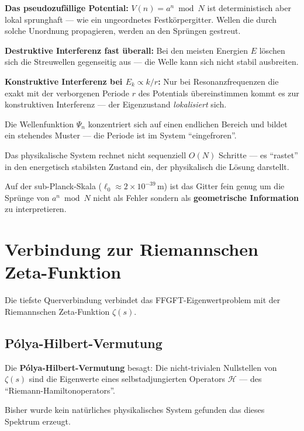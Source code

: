\textbf{Das pseudozufällige Potential:}
$V(n) = a^n \bmod N$ ist deterministisch aber
lokal sprunghaft --- wie ein ungeordnetes Festkörpergitter.
Wellen die durch solche Unordnung propagieren,
werden an den Sprüngen gestreut.

\textbf{Destruktive Interferenz fast überall:}
Bei den meisten Energien $E$ löschen sich die
Streuwellen gegenseitig aus ---
die Welle kann sich nicht stabil ausbreiten.

\textbf{Konstruktive Interferenz bei $E_k \propto k/r$:}
Nur bei Resonanzfrequenzen die exakt mit der
verborgenen Periode $r$ des Potentials übereinstimmen
kommt es zur konstruktiven Interferenz ---
der Eigenzustand \emph{lokalisiert} sich.

\begin{foundation}
Die Wellenfunktion $\Psi_n$ konzentriert sich
auf einen endlichen Bereich und bildet ein
stehendes Muster --- die Periode ist
im System ``eingefroren''.

Das physikalische System rechnet nicht sequenziell
$O(N)$ Schritte --- es ``rastet'' in den
energetisch stabilsten Zustand ein,
der physikalisch die Lösung darstellt.

Auf der sub-Planck-Skala ($\ell_0 \approx 2 \times 10^{-39}$\,m)
ist das Gitter fein genug um die Sprünge von
$a^n \bmod N$ nicht als Fehler sondern als
\textbf{geometrische Information} zu interpretieren.
\end{foundation}

\section{Verbindung zur Riemannschen Zeta-Funktion}
\label{sec:zeta}

Die tiefste Querverbindung verbindet das
FFGFT-Eigenwertproblem mit der
Riemannschen Zeta-Funktion $\zeta(s)$.

\subsection{Pólya-Hilbert-Vermutung}

Die \textbf{Pólya-Hilbert-Vermutung} besagt:
Die nicht-trivialen Nullstellen von $\zeta(s)$
sind die Eigenwerte eines selbstadjungierten
Operators $\mathcal{H}$ --- des
``Riemann-Hamiltonoperators''.

Bisher wurde kein natürliches physikalisches System
gefunden das dieses Spektrum erzeugt.

